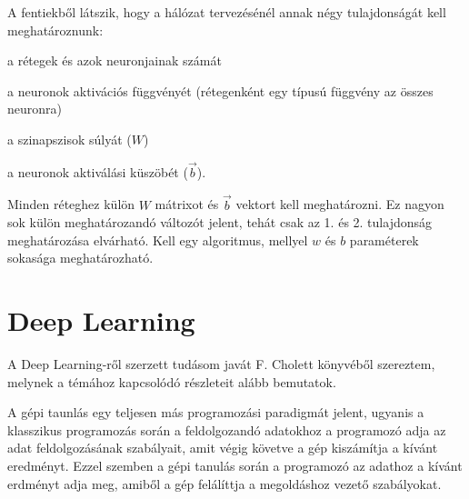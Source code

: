 A fentiekből látszik, hogy a hálózat tervezésénél annak négy tulajdonságát kell meghatároznunk:
\begin{enumerate*}
	\item a rétegek és azok neuronjainak számát
	\item a neuronok aktivációs függvényét (rétegenként egy típusú függvény az összes neuronra)
	\item a szinapszisok súlyát ($W$)
	\item a neuronok aktiválási küszöbét ($\vec{b}$).
\end{enumerate*}
Minden réteghez külön $W$ mátrixot és $\vec{b}$ vektort kell meghatározni. Ez nagyon sok külön meghatározandó változót jelent, tehát csak az 1. és 2. tulajdonság meghatározása elvárható. Kell egy algoritmus, mellyel $w$ és $b$ paraméterek sokasága meghatározható. %

\section{Deep Learning}
A Deep Learning-ről szerzett tudásom javát F. Cholett könyvéből\cite{Chollet} szereztem, melynek a témához kapcsolódó részleteit alább bemutatok.

A gépi taunlás egy teljesen más programozási paradigmát jelent, ugyanis a klasszikus programozás során a feldolgozandó adatokhoz a programozó adja az adat feldolgozásának szabályait, amit végig követve a gép kiszámítja a kívánt eredményt. Ezzel szemben a gépi tanulás során a programozó az adathoz  a kívánt erdményt adja meg, amiből a gép felálíttja a megoldáshoz vezető szabályokat.%

